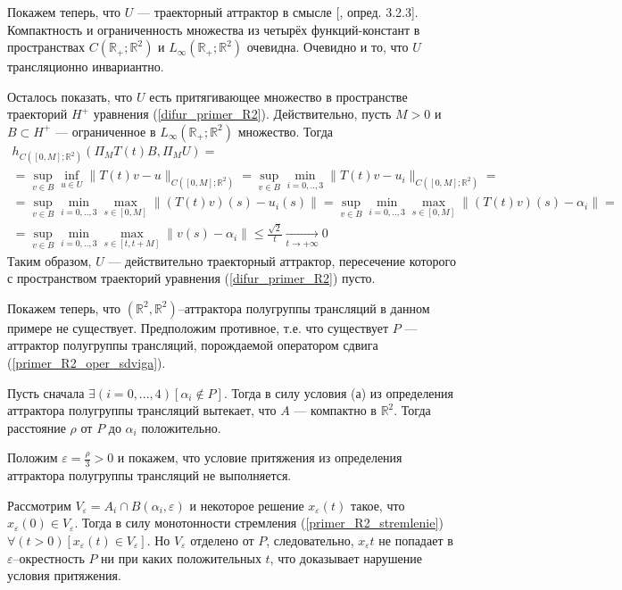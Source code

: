 Покажем теперь, что $U$ --- траекторный аттрактор в смысле [\cite{Zelenaya}, опред. 3.2.3].
Компактность и ограниченность множества из четырёх функций-констант в пространствах
$C(\mathbb{R}_+; \mathbb{R}^2)$ и $L_\infty(\mathbb{R}_+; \mathbb{R}^2)$ очевидна.
Очевидно и то, что $U$ трансляционно инвариантно.

Осталось показать, что $U$ есть притягивающее множество в пространстве траекторий $H^+$ уравнения (\ref{difur_primer_R2}).
Действительно, пусть $M>0$ и $B\subset H^+$ --- ограниченное в $L_\infty(\mathbb{R}_+; \mathbb{R}^2)$ множество.
Тогда
\begin{multline*}
	h_{C([0,M];\mathbb{R}^2)}(\Pi_M T(t)B,\Pi_M U) =
	\\ =
	\sup_{v\in B} \inf_{u\in U} \| T(t) v - u \|_{C([0,M];\mathbb{R}^2)} =
	\sup_{v\in B} \min_{i=0,..,3} \| T(t) v - u_i \|_{C([0,M];\mathbb{R}^2)} =
	\\ =
	\sup_{v\in B} \min_{i=0,..,3} \max_{s\in[0,M]} \| (T(t) v)(s) - u_i(s) \| =
	\sup_{v\in B} \min_{i=0,..,3} \max_{s\in[0,M]} \| (T(t) v)(s) - \alpha_i \| =
	\\ =
	\sup_{v\in B} \min_{i=0,..,3} \max_{s\in[t,t+M]} \| v(s) - \alpha_i \| \leq
	\frac{\sqrt{2}}{t} \xrightarrow[t\to + \infty]{} 0
\end{multline*}
Таким образом, $U$ --- действительно траекторный аттрактор, пересечение которого с пространством траекторий
уравнения (\ref{difur_primer_R2}) пусто.


Покажем теперь, что $(\mathbb{R}^2,\mathbb{R}^2)$--аттрактора полугруппы трансляций в данном примере не существует.
Предположим противное, т.е. что существует $P$ --- аттрактор полугруппы трансляций,
порождаемой оператором сдвига (\ref{primer_R2_oper_sdviga}).

Пусть сначала $\exists(i=0,...,4)[\alpha_i \notin P]$.
Тогда в силу условия (а) из определения аттрактора полугруппы трансляций вытекает,
что $A$ --- компактно в $\mathbb{R}^2$.
Тогда расстояние $\rho$ от $P$ до $\alpha_i$ положительно.

Положим $\varepsilon = \frac{\rho}{3} > 0$ и покажем,
что условие притяжения из определения аттрактора полугруппы трансляций не выполняется.

Рассмотрим $V_\varepsilon = A_i \cap B(\alpha_i, \varepsilon)$ и некоторое решение $x_\varepsilon(t)$
такое, что $x_\varepsilon(0) \in V_\varepsilon$.
Тогда в силу монотонности стремления (\ref{primer_R2_stremlenie})
$\forall(t>0)[x_\varepsilon(t) \in V_\varepsilon]$.
Но $V_\varepsilon$ отделено от $P$, следовательно, $x_\varepsilon{t}$ не попадает в $\varepsilon$--окрестность $P$
ни при каких положительных $t$, что доказывает нарушение условия притяжения.

